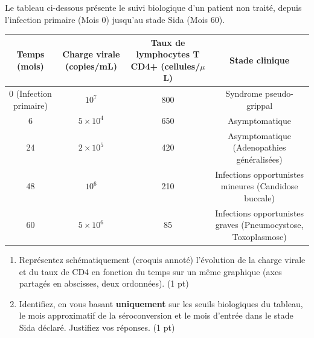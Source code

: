 \documentclass[11pt]{article}
\begin{document}
\begin{exercice}
\label{exo:evolution}
Le tableau ci-dessous présente le suivi biologique d'un patient non traité, depuis l'infection primaire (Mois 0) jusqu'au stade Sida (Mois 60).

\medskip
\begin{tabular}{|c|c|c|c|}
\hline
\textbf{Temps (mois)} & \textbf{Charge virale (copies/mL)} & \textbf{Taux de lymphocytes T CD4+ (cellules/$\mu$L)} & \textbf{Stade clinique} \\
\hline
0 (Infection primaire) & $10^7$ & 800 & Syndrome pseudo-grippal \\
\hline
6 & $5 \times 10^4$ & 650 & Asymptomatique \\
\hline
24 & $2 \times 10^5$ & 420 & Asymptomatique (Adenopathies généralisées) \\
\hline
48 & $10^6$ & 210 & Infections opportunistes mineures (Candidose buccale) \\
\hline
60 & $5 \times 10^6$ & 85 & Infections opportunistes graves (Pneumocystose, Toxoplasmose) \\
\hline
\end{tabular}

\medskip
\begin{enumerate}
    \item Représentez schématiquement (croquis annoté) l'évolution de la charge virale et du taux de CD4 en fonction du temps sur un même graphique (axes partagés en abscisses, deux ordonnées). \hfill (1 pt)
    \item Identifiez, en vous basant \textbf{uniquement} sur les seuils biologiques du tableau, le mois approximatif de la séroconversion et le mois d'entrée dans le stade Sida déclaré. Justifiez vos réponses. \hfill (1 pt)
\end{enumerate}
\end{exercice}
\end{document}
